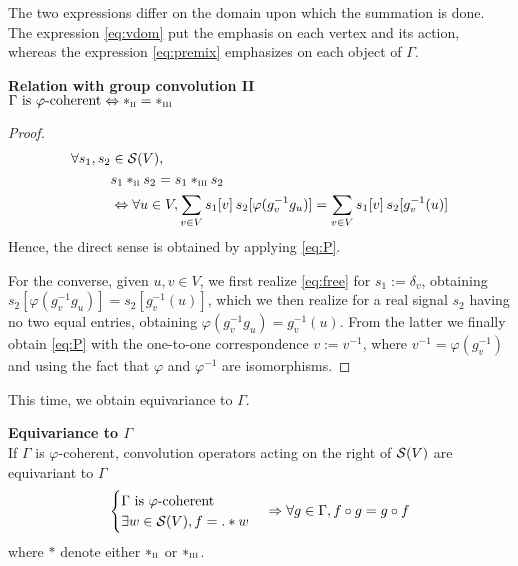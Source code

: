 The two expressions differ on the domain upon which the summation is done. The expression \eqref{eq:vdom} put the emphasis on each vertex and its action, whereas the expression \eqref{eq:premix} emphasizes on each object of $\Gamma$.

\begin{lemma}\textbf{Relation with group convolution II}\\
$\Gamma \text{ is } \varphi \text{-coherent} \Leftrightarrow \ast_{\II} = \ast_{\III}$
\label{lem:rel}
\end{lemma}

\begin{proof}
\begin{align}
\forall s_1, s_2 & \in \cs(V),\nonumber\\
& s_1 \ast_{\II} s_2 = s_1 \ast_{\III} s_2 \nonumber\\
& \Leftrightarrow \forall u \in V,
\displaystyle \sum_{v \in V} s_1[v] \h{2} s_2[\varphi(g_v^{-1}g_u)] = \displaystyle \sum_{v \in V} s_1[v] \h{2} s_2[g_v^{-1}(u)] \label{eq:free}
\end{align}
Hence, the direct sense is obtained by applying \eqref{eq:P}. 

For the converse, given $u, v \in V$, we first realize \eqref{eq:free} for $s_1 := \delta_v$, obtaining $s_2[\varphi(g_v^{-1}g_u)] = s_2[g_v^{-1}(u)]$, which we then realize for a real signal $s_2$ having no two equal entries, obtaining $\varphi(g_v^{-1}g_u) = g_v^{-1}(u)$. From the latter we finally obtain \eqref{eq:P} with the one-to-one correspondence $v := v^{-1}$, where $v^{-1} = \varphi(g_v^{-1})$ and using the fact that $\varphi$ and $\varphi^{-1}$ are isomorphisms.
\end{proof}

This time, we obtain equivariance to $\Gamma$.

\begin{proposition}\textbf{Equivariance to $\Gamma$}\\
If $\Gamma$ is $\varphi$-coherent, convolution operators acting on the right of $\cs(V)$ are equivariant to $\Gamma$ \ie
\begin{gather*}
\begin{cases}
\Gamma \text{ is } \varphi \text{-coherent}\\
\exists w \in \cs(V), f = . \ast w
\end{cases}
\Rightarrow \forall g \in \Gamma, f \circ g = g \circ f
\end{gather*}
where $\ast$ denote either $\ast_{\II}$ or $\ast_{\III}$.
\label{prop:equi}
\end{proposition}

